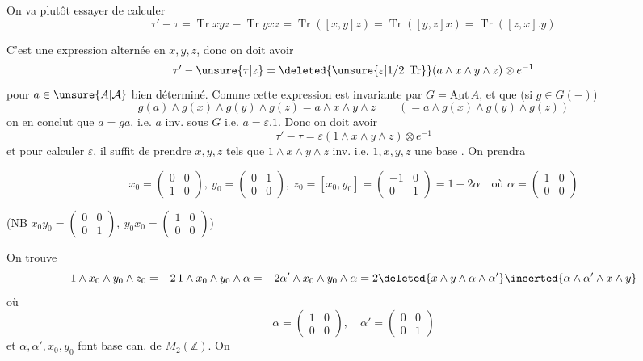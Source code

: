 On va plutôt essayer de calculer
\[
 \tau'-\tau=\operatorname{Tr}xyz-\operatorname{Tr}yxz=\operatorname{Tr}([x,y]z)=\operatorname{Tr}([y,z]x)=\operatorname{Tr}([z,x].y)
\]

C'est une expression  alternée en $x,y,z$, donc on doit avoir
\[
 \tau'-\unsure{\tau|z}=\deleted{\unsure{\varepsilon|1/2|\operatorname{Tr}}}(a\wedge x\wedge y\wedge z)\otimes e^{-1}
\]
pour $a\in\unsure{A|\mathcal A}$ bien déterminé. Comme cette expression est invariante par $G=\underline{\mathrm{Aut}}\,A$,  et que (si $g\in G(-)$)
\[
 g(a)\wedge g(x)\wedge g(y)\wedge g(z)=a\wedge x\wedge y\wedge z\qquad(=a\wedge g(x)\wedge g(y)\wedge g(z))
\]
on en conclut que $a=ga$, i.e. $a$ inv. sous $G$ i.e. $a=\varepsilon.1$. Donc on doit avoir
\[
 \tau'-\tau=\varepsilon(1\wedge x\wedge y\wedge z)\otimes e^{-1}
\]
et pour calculer $\varepsilon$, il suffit de prendre $x,y,z$ tels que $1\wedge x\wedge y\wedge z$ inv. i.e. $1,x,y,z$ une base . On prendra

\[
 x_0=\begin{pmatrix}0&0\\1&0\end{pmatrix},\ y_0=\begin{pmatrix}0&1\\0&0\end{pmatrix},\ z_0=[x_0,y_0]=\begin{pmatrix}-1&0\\0&1\end{pmatrix}=1-2\alpha
 \quad\text{où }\alpha=\begin{pmatrix}1&0\\0&0\end{pmatrix}
\]

(NB \(\displaystyle x_0y_0=\begin{pmatrix}0&0\\0&1\end{pmatrix},\ y_0x_0=\begin{pmatrix}1&0\\0&0\end{pmatrix}\))

On trouve
\[
 1\wedge x_0\wedge y_0\wedge z_0=-2\,1\wedge x_0\wedge y_0\wedge\alpha
 =-2\alpha'\wedge x_0\wedge y_0\wedge\alpha
 =2\deleted{x\wedge y\wedge\alpha\wedge\alpha'}\inserted{\alpha\wedge\alpha'\wedge x\wedge y}
\]
où
\[
 \alpha=\begin{pmatrix}1&0\\0&0\end{pmatrix},\quad \alpha'=\begin{pmatrix}0&0\\0&1\end{pmatrix}
\]
et  $\alpha,\alpha',x_0,y_0$ font base can. de $M_2(\mathbb Z)$. On

